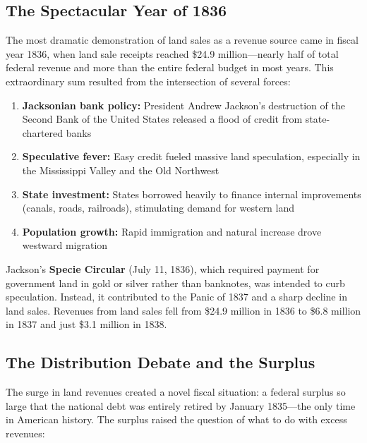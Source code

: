 \documentclass[12pt]{article}
\begin{document}
\subsection{The Spectacular Year of 1836}

The most dramatic demonstration of land sales as a revenue source came in fiscal year 1836, when land sale receipts reached \$24.9 million---nearly half of total federal revenue and more than the entire federal budget in most years.  This extraordinary sum resulted from the intersection of several forces:

\begin{enumerate}
\item \textbf{Jacksonian bank policy:} President Andrew Jackson's destruction of the Second Bank of the United States released a flood of credit from state-chartered banks
\item \textbf{Speculative fever:} Easy credit fueled massive land speculation, especially in the Mississippi Valley and the Old Northwest
\item \textbf{State investment:} States borrowed heavily to finance internal improvements (canals, roads, railroads), stimulating demand for western land
\item \textbf{Population growth:} Rapid immigration and natural increase drove westward migration
\end{enumerate}

Jackson's \textbf{Specie Circular} (July 11, 1836), which required payment for government land in gold or silver rather than banknotes, was intended to curb speculation.  Instead, it contributed to the Panic of 1837 and a sharp decline in land sales.  Revenues from land sales fell from \$24.9 million in 1836 to \$6.8 million in 1837 and just \$3.1 million in 1838.

\subsection{The Distribution Debate and the Surplus}

The surge in land revenues created a novel fiscal situation: a federal surplus so large that the national debt was entirely retired by January 1835---the only time in American history.  The surplus raised the question of what to do with excess revenues:
\end{document}

